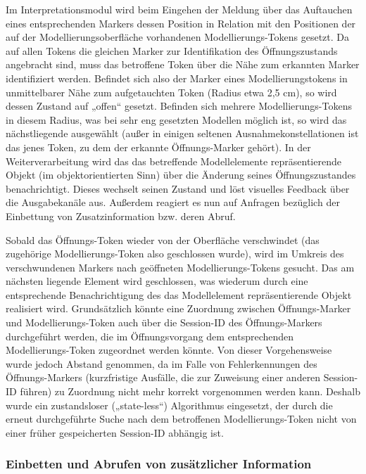 Im Interpretationsmodul wird beim Eingehen der Meldung über das Auftauchen eines entsprechenden Markers dessen Position in Relation mit den Positionen der auf der Modellierungsoberfläche vorhandenen Modellierungs-Tokens gesetzt. Da auf allen Tokens die gleichen Marker zur Identifikation des Öffnungszustands angebracht sind, muss das betroffene Token über die Nähe zum erkannten Marker identifiziert werden. Befindet sich also der Marker eines Modellierungstokens in unmittelbarer Nähe zum aufgetauchten Token (Radius etwa 2,5 cm), so wird dessen Zustand auf „offen“ gesetzt. Befinden sich mehrere Modellierungs-Tokens in diesem Radius, was bei sehr eng gesetzten Modellen möglich ist, so wird das nächstliegende ausgewählt (außer in einigen seltenen Ausnahmekonstellationen ist das jenes Token, zu dem der erkannte Öffnungs-Marker gehört). In der Weiterverarbeitung wird das das betreffende Modellelemente repräsentierende Objekt (im objektorientierten Sinn) über die Änderung seines Öffnungszustandes benachrichtigt. Dieses wechselt seinen Zustand und löst visuelles Feedback über die Ausgabekanäle aus. Außerdem reagiert es nun auf Anfragen bezüglich der Einbettung von Zusatzinformation bzw. deren Abruf.

Sobald das Öffnungs-Token wieder von der Oberfläche verschwindet (das zugehörige Modellierungs-Token also geschlossen wurde), wird im Umkreis des verschwundenen Markers nach geöffneten Modellierungs-Tokens gesucht. Das am nächsten liegende Element wird geschlossen, was wiederum durch eine entsprechende Benachrichtigung des das Modellelement repräsentierende Objekt realisiert wird. Grundsätzlich könnte eine Zuordnung zwischen Öffnungs-Marker und Modellierungs-Token auch über die Session-ID des Öffnungs-Markers durchgeführt werden, die im Öffnungsvorgang dem entsprechenden Modellierungs-Token zugeordnet werden könnte. Von dieser Vorgehensweise wurde jedoch Abstand genommen, da im Falle von Fehlerkennungen des Öffnungs-Markers (kurzfristige Ausfälle, die zur Zuweisung einer anderen Session-ID führen) zu Zuordnung nicht mehr korrekt vorgenommen werden kann. Deshalb wurde ein zustandsloser („state-less“) Algorithmus eingesetzt, der durch die erneut durchgeführte Suche nach dem betroffenen Modellierungs-Token nicht von einer früher gespeicherten Session-ID abhängig ist.

\subsubsection{Einbetten und Abrufen von zusätzlicher Information} %
\label{ssub:einbetten_und_abrufen_von_eingebetteter_information}


